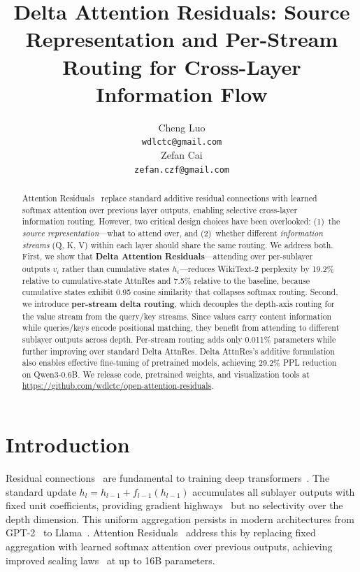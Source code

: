 \documentclass{article}
\title{Delta Attention Residuals: Source Representation and Per-Stream Routing for Cross-Layer Information Flow}
\author{
  Cheng Luo \\
  \texttt{wdlctc@gmail.com} \\
  \And
  Zefan Cai \\
  \texttt{zefan.czf@gmail.com} \\
}
\begin{document}
\maketitle

\begin{abstract}
Attention Residuals~\citep{kimi2025attention} replace standard additive residual connections with learned softmax attention over previous layer outputs, enabling selective cross-layer information routing. However, two critical design choices have been overlooked: (1)~the \emph{source representation}---what to attend over, and (2)~whether different \emph{information streams} (Q, K, V) within each layer should share the same routing. We address both. First, we show that \textbf{Delta Attention Residuals}---attending over per-sublayer outputs $v_i$ rather than cumulative states $h_i$---reduces WikiText-2 perplexity by 19.2\% relative to cumulative-state AttnRes and 7.5\% relative to the baseline, because cumulative states exhibit 0.95 cosine similarity that collapses softmax routing. Second, we introduce \textbf{per-stream delta routing}, which decouples the depth-axis routing for the value stream from the query/key streams. Since values carry content information while queries/keys encode positional matching, they benefit from attending to different sublayer outputs across depth. Per-stream routing adds only 0.011\% parameters while further improving over standard Delta AttnRes. Delta AttnRes's additive formulation also enables effective fine-tuning of pretrained models, achieving 29.2\% PPL reduction on Qwen3-0.6B. We release code, pretrained weights, and visualization tools at \url{https://github.com/wdlctc/open-attention-residuals}.
\end{abstract}

\section{Introduction}

Residual connections~\citep{he2016deep} are fundamental to training deep transformers~\citep{vaswani2017attention}. The standard update $h_l = h_{l-1} + f_{l-1}(h_{l-1})$ accumulates all sublayer outputs with fixed unit coefficients, providing gradient highways~\citep{veit2016residual} but no selectivity over the depth dimension. This uniform aggregation persists in modern architectures from GPT-2~\citep{radford2019gpt2} to Llama~\citep{touvron2023llama}. Attention Residuals~\citep{kimi2025attention} address this by replacing fixed aggregation with learned softmax attention over previous outputs, achieving improved scaling laws~\citep{kaplan2020scaling} at up to 16B parameters.
\end{document}
